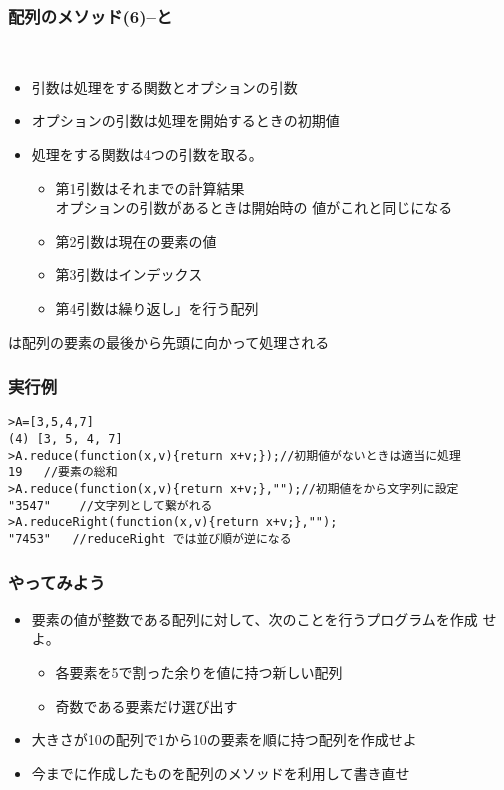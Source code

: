 \begin{frame}[containsverbatim]
 \frametitle{配列のメソッド(6)--と}
 \\
 \begin{itemize}
	\item 引数は処理をする関数とオプションの引数
	\item オプションの引数は処理を開始するときの初期値
	\item 処理をする関数は4つの引数を取る。
				\begin{itemize}
				 \item 第1引数はそれまでの計算結果\\オプションの引数があるときは開始時の
							 値がこれと同じになる
				 \item 第2引数は現在の要素の値
				 \item 第3引数はインデックス
				 \item 第4引数は繰り返し」を行う配列
				\end{itemize}
 \end{itemize}
 は配列の要素の最後から先頭に向かって処理される
\end{frame}
 \begin{frame}[containsverbatim]
	\frametitle{実行例}
\begin{Verbatim}
>A=[3,5,4,7]
(4) [3, 5, 4, 7]
>A.reduce(function(x,v){return x+v;});//初期値がないときは適当に処理
19   //要素の総和
>A.reduce(function(x,v){return x+v;},"");//初期値をから文字列に設定
"3547"    //文字列として繋がれる
>A.reduceRight(function(x,v){return x+v;},"");
"7453"   //reduceRight では並び順が逆になる
\end{Verbatim}
 \end{frame}
\begin{frame}[containsverbatim]
 \frametitle{やってみよう}
 \begin{itemize}
	\item 要素の値が整数である配列に対して、次のことを行うプログラムを作成
				せよ。
				\begin{itemize}
				 \item 各要素を5で割った余りを値に持つ新しい配列
				 \item 奇数である要素だけ選び出す
				\end{itemize}
	\item 大きさが10の配列で1から10の要素を順に持つ配列を作成せよ
	\item 今までに作成したものを配列のメソッドを利用して書き直せ
 \end{itemize}
\end{frame}

\begin{frame}[containsverbatim]
 \frametitle{}
\end{frame}
